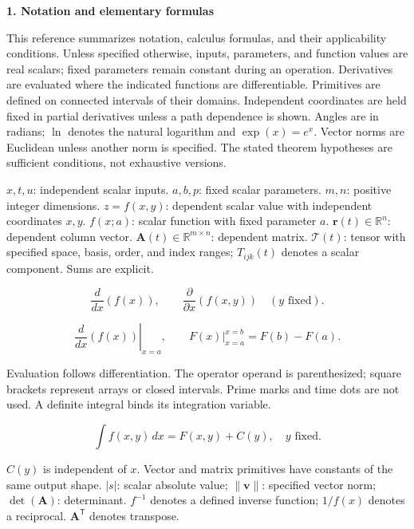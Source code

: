 \documentclass[11pt,oneside,openany]{book}
\begin{document}
\fontsize{9}{11}\selectfont
\setlength{\abovedisplayskip}{4pt}
\setlength{\belowdisplayskip}{4pt}
\setlength{\abovedisplayshortskip}{2pt}
\setlength{\belowdisplayshortskip}{2pt}
{\sffamily\large\bfseries 1. Notation and elementary formulas\par}\vspace{5pt}
\begin{minipage}[t]{0.485\textwidth}\vspace{0pt}
This reference summarizes notation, calculus formulas, and their applicability
conditions. Unless specified otherwise, inputs, parameters, and function values
are real scalars; fixed parameters remain constant during an operation.
Derivatives are evaluated where the indicated functions are differentiable.
Primitives are defined on connected intervals of their domains. Independent
coordinates are held fixed in partial derivatives unless a path dependence is
shown. Angles are in radians; \(\ln\) denotes the natural logarithm and
\(\exp(x)=e^x\). Vector norms are Euclidean unless another norm is specified.
The stated theorem hypotheses are sufficient conditions, not exhaustive versions.


\(x,t,u\): independent scalar inputs. \(a,b,p\): fixed scalar parameters.
\(m,n\): positive integer dimensions.
\(z=f(x,y)\): dependent scalar value with independent coordinates \(x,y\).
\(f(x;a)\): scalar function with fixed parameter \(a\).
\(\mathbf r(t)\in\mathbb R^n\): dependent column vector.
\(\mathbf A(t)\in\mathbb R^{m\times n}\): dependent matrix.
\(\boldsymbol{\mathcal T}(t)\): tensor with specified space, basis, order, and index ranges;
\(T_{ijk}(t)\) denotes a scalar component. Sums are explicit.


\[
\frac{d}{dx}(f(x)),\qquad
\frac{\partial}{\partial x}(f(x,y))\quad(y\text{ fixed}).
\]

\[
\left.\frac{d}{dx}(f(x))\right|_{x=a},\qquad
\left.F(x)\right|_{x=a}^{x=b}=F(b)-F(a).
\]

Evaluation follows differentiation. The operator operand is parenthesized;
square brackets represent arrays or closed intervals. Prime marks and time dots
are not used. A definite integral binds its integration variable.

\[
\int f(x,y)\,dx=F(x,y)+C(y),\quad y\text{ fixed}.
\]

\(C(y)\) is independent of \(x\). Vector and matrix primitives have constants of the
same output shape. \(|s|\): scalar absolute value; \(\lVert\mathbf v\rVert\): specified
vector norm; \(\det(\mathbf A)\): determinant. \(f^{-1}\) denotes a defined inverse
function; \(1/f(x)\) denotes a reciprocal. \(\mathbf A^{\mathsf T}\) denotes transpose.


\end{minipage}
\end{document}
